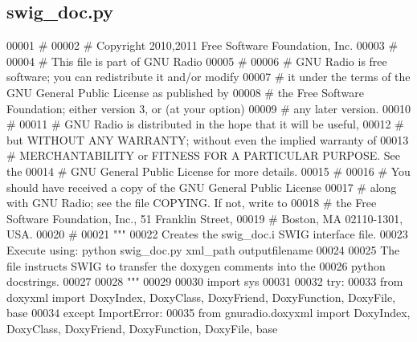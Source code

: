 \subsection{swig\+\_\+doc.\+py}
\label{swig__doc_8py_source}

\begin{DoxyCode}
00001 \textcolor{comment}{#}
00002 \textcolor{comment}{# Copyright 2010,2011 Free Software Foundation, Inc.}
00003 \textcolor{comment}{#}
00004 \textcolor{comment}{# This file is part of GNU Radio}
00005 \textcolor{comment}{#}
00006 \textcolor{comment}{# GNU Radio is free software; you can redistribute it and/or modify}
00007 \textcolor{comment}{# it under the terms of the GNU General Public License as published by}
00008 \textcolor{comment}{# the Free Software Foundation; either version 3, or (at your option)}
00009 \textcolor{comment}{# any later version.}
00010 \textcolor{comment}{#}
00011 \textcolor{comment}{# GNU Radio is distributed in the hope that it will be useful,}
00012 \textcolor{comment}{# but WITHOUT ANY WARRANTY; without even the implied warranty of}
00013 \textcolor{comment}{# MERCHANTABILITY or FITNESS FOR A PARTICULAR PURPOSE.  See the}
00014 \textcolor{comment}{# GNU General Public License for more details.}
00015 \textcolor{comment}{#}
00016 \textcolor{comment}{# You should have received a copy of the GNU General Public License}
00017 \textcolor{comment}{# along with GNU Radio; see the file COPYING.  If not, write to}
00018 \textcolor{comment}{# the Free Software Foundation, Inc., 51 Franklin Street,}
00019 \textcolor{comment}{# Boston, MA 02110-1301, USA.}
00020 \textcolor{comment}{#}
00021 \textcolor{stringliteral}{"""}
00022 \textcolor{stringliteral}{Creates the swig\_doc.i SWIG interface file.}
00023 \textcolor{stringliteral}{Execute using: python swig\_doc.py xml\_path outputfilename}
00024 \textcolor{stringliteral}{}
00025 \textcolor{stringliteral}{The file instructs SWIG to transfer the doxygen comments into the}
00026 \textcolor{stringliteral}{python docstrings.}
00027 \textcolor{stringliteral}{}
00028 \textcolor{stringliteral}{"""}
00029 
00030 \textcolor{keyword}{import} sys
00031 
00032 \textcolor{keywordflow}{try}:
00033     \textcolor{keyword}{from} doxyxml \textcolor{keyword}{import} DoxyIndex, DoxyClass, DoxyFriend, DoxyFunction, DoxyFile, base
00034 \textcolor{keywordflow}{except} ImportError:
00035     \textcolor{keyword}{from} gnuradio.doxyxml \textcolor{keyword}{import} DoxyIndex, DoxyClass, DoxyFriend, DoxyFunction, DoxyFile, base

\end{DoxyCode}
